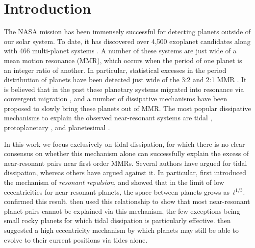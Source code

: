 \section{Introduction}
\label{sec:introduction}
The NASA \kep{} mission has been immensely successful for detecting planets outside of our solar system.
To date, it has discovered over 4,500 exoplanet candidates along with 466 multi-planet systems \citep{Akeson2013,Rowe2014}. 
A number of these systems are just wide of a mean motion resonance (MMR), which occurs when the period of one planet is an integer ratio of another. 
In particular, statistical excesses in the period distribution of \kep{} planets have been detected just wide of the 3:2 and 2:1 MMR \citep[][]{Lissauer2011,Fabrycky2014,Steffen2015}.
It is believed that in the past these planetary systems migrated into resonance via convergent migration \citep{Lee2002}, and a number of dissipative mechanisms have been proposed to slowly bring these planets out of MMR.
The most popular dissipative mechanisms to explain the observed near-resonant systems are tidal \citep{LithwickWu2012, Batygin2013, Delisle2014},  protoplanetary \citep{Rein2012b, Baruteau2013, Goldreich2014}, and planetesimal \citep{Moore2013, Chatterjee2015}. 

In this work we focus exclusively on tidal dissipation, for which there is no clear consensus on whether this mechanism alone can successfully explain the excess of near-resonant pairs near first order MMRs. 
Several authors \citep{LithwickWu2012,Batygin2013} have argued for \citep{Delisle2014} tidal dissipation, whereas others \citep{Lee2013} have argued against it. 
In particular, \citet{LithwickWu2012} first introduced the mechanism of \textit{resonant repulsion}, and showed that in the limit of low eccentricities for near-resonant planets, the space between planets grows as~$t^{1/3}$.
\citet{Batygin2013} confirmed this result.
\citet{Lee2013} then used this relationship to show that most near-resonant planet pairs cannot be explained via this mechanism, the few exceptions being small rocky planets for which tidal dissipation is particularly effective.
\citet{Delisle2014} then suggested a high eccentricity mechanism by which planets may still be able to evolve to their current positions via tides alone.

